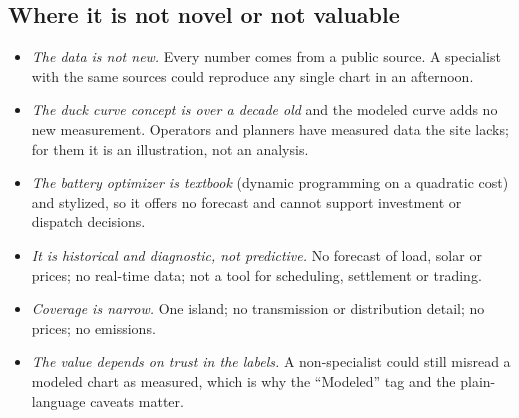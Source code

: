 \documentclass[11pt,a4paper]{article}
\begin{document}
\subsection{Where it is not novel or not valuable}
\begin{itemize}
\item \emph{The data is not new.} Every number comes from a public source. A specialist with the same sources
 could reproduce any single chart in an afternoon.
\item \emph{The duck curve concept is over a decade old} and the modeled curve adds no new measurement.
 Operators and planners have measured data the site lacks; for them it is an illustration, not an analysis.
\item \emph{The battery optimizer is textbook} (dynamic programming on a quadratic cost) and stylized, so it
 offers no forecast and cannot support investment or dispatch decisions.
\item \emph{It is historical and diagnostic, not predictive.} No forecast of load, solar or prices; no
 real-time data; not a tool for scheduling, settlement or trading.
\item \emph{Coverage is narrow.} One island; no transmission or distribution detail; no prices; no emissions.
\item \emph{The value depends on trust in the labels.} A non-specialist could still misread a modeled chart as
 measured, which is why the ``Modeled'' tag and the plain-language caveats matter.
\end{itemize}
\end{document}
